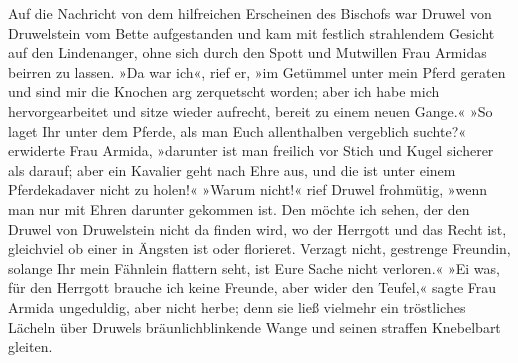 \pagenum{[45]}Auf die Nachricht von dem hilfreichen Erscheinen des
Bischofs war Druwel von Druwelstein vom Bette aufgestanden und kam
mit festlich strahlendem Gesicht auf den Lindenanger, ohne sich
durch den Spott und Mutwillen Frau Armidas beirren zu lassen. »Da
war ich«, rief er, »im Getümmel unter mein Pferd geraten und sind
mir die Knochen arg zerquetscht worden; aber ich habe mich
hervorgearbeitet und sitze wieder aufrecht, bereit zu einem neuen
Gange.« »So laget Ihr unter dem Pferde, als man Euch allenthalben
vergeblich suchte?« erwiderte Frau Armida, »darunter ist man
freilich vor Stich und Kugel sicherer als darauf; aber ein Kavalier
geht nach Ehre aus, und die ist unter einem Pferdekadaver nicht zu
holen!« »Warum nicht!« rief Druwel frohmütig, »wenn man nur mit
Ehren darunter gekommen ist. Den möchte ich sehen, der den Druwel
von Druwelstein nicht da finden wird, wo der Herrgott und das Recht
ist, gleichviel ob einer in Ängsten ist oder florieret. Verzagt
nicht, gestrenge Freundin, solange Ihr mein Fähnlein flattern seht,
ist Eure Sache nicht verloren.« »Ei was, für den Herrgott brauche
ich keine Freunde, aber wider den Teufel,« sagte Frau Armida
ungeduldig, aber nicht herbe; denn sie ließ vielmehr ein
tröstliches Lächeln über Druwels bräunlichblinkende Wange und
seinen straffen Knebelbart gleiten.

